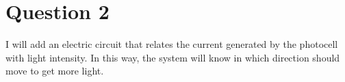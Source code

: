 \section{Question 2}
I will add an electric circuit that relates the current generated by the photocell with light intensity. In this way, the system will know in which direction should move to get more light.
